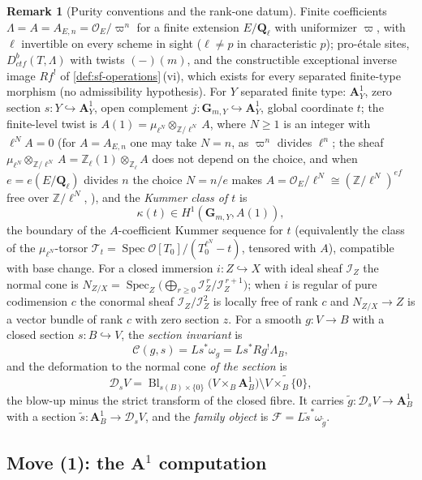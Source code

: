 \documentclass[11pt]{article}
\theoremstyle{plain}
\theoremstyle{definition}
\newtheorem{remark}[theorem]{Remark}
\newcommand{\Z}{\mathbb Z}
\newcommand{\Aaf}{\mathbf A}
\DeclareMathOperator{\Spec}{Spec}
\newcommand{\Cref}[1]{\hyperref[#1]{\ref{#1}}\,\hyperref[#1]{\nameref*{#1}}}
\begin{document}
\begin{remark}[Purity conventions and the rank-one datum]
\label{def:purity-conv}
Finite coefficients $\Lambda=A=A_{E,n}=\mathcal O_E/\varpi^n$ for a finite
extension $E/\mathbf Q_\ell$ with uniformizer $\varpi$, with $\ell$ invertible on
every scheme in sight ($\ell\ne p$ in characteristic $p$); pro-\'etale sites,
$D^b_{ctf}(T,\Lambda)$ with twists $(-)(m)$, and the constructible exceptional
inverse image $Rf^{!}$ of \Cref{def:sf-operations}(vi), which exists for every
separated finite-type morphism (no admissibility hypothesis).  For $Y$ separated finite type: $\Aaf^1_Y$, zero section
$s:Y\hookrightarrow\Aaf^1_Y$, open complement
$j:\mathbf G_{m,Y}\hookrightarrow\Aaf^1_Y$, global coordinate $t$; the
finite-level twist is $A(1)=\mu_{\ell^N}\otimes_{\Z/\ell^N}A$, where
$N\ge1$ is an integer with $\ell^NA=0$ (for $A=A_{E,n}$ one may take $N=n$,
as $\varpi^n$ divides $\ell^n$; the sheaf
$\mu_{\ell^N}\otimes_{\Z/\ell^N}A=\Z_\ell(1)\otimes_{\Z_\ell}A$ does not depend
on the choice, and when $e=e(E/\mathbf Q_\ell)$ divides $n$ the choice
$N=n/e$ makes $A=\mathcal O_E/\ell^N\cong(\Z/\ell^N)^{ef}$ free over
$\Z/\ell^N$, ), and the
\emph{Kummer class of $t$} is
\[
\kappa(t)\in H^1(\mathbf G_{m,Y},A(1)),
\]
the boundary of the $A$-coefficient Kummer sequence for $t$
(equivalently the class of the $\mu_{\ell^N}$-torsor
$\mathcal T_t=\Spec\mathcal O[T_0]/(T_0^{\ell^N}-t)$, tensored with $A$),
compatible with base change.  For a closed immersion $i:Z\hookrightarrow X$ with ideal sheaf
$\mathcal I_Z$ the normal cone is
$N_{Z/X}=\Spec_Z\bigl(\bigoplus_{r\ge0}\mathcal I_Z^{\,r}/\mathcal I_Z^{\,r+1}\bigr)$;
when $i$ is regular of pure codimension $c$ the conormal sheaf
$\mathcal I_Z/\mathcal I_Z^2$ is locally free of rank $c$ and $N_{Z/X}\to Z$
is a vector bundle of rank $c$ with zero section $z$.  For a smooth
$g:V\to B$ with a closed section $s:B\hookrightarrow V$, the \emph{section
invariant} is
\[
\mathcal C(g,s)=Ls^{*}\omega_g=Ls^{*}Rg^{!}\Lambda_B ,
\]
and the deformation to the normal cone \emph{of the section} is
\[
\mathcal D_sV=\operatorname{Bl}_{s(B)\times\{0\}}
\bigl(V\times_B\Aaf^1_B\bigr)\setminus\widetilde{V\times_B\{0\}},
\]
the blow-up minus the strict transform of the closed fibre.  It carries
$\widetilde g:\mathcal D_sV\to\Aaf^1_B$ with a section
$\widetilde s:\Aaf^1_B\to\mathcal D_sV$, and the \emph{family object} is
$\mathcal F=L\widetilde s^{*}\omega_{\widetilde g}$.
\end{remark}

\subsection{Move (1): the $\mathbf A^1$ computation}
\end{document}
